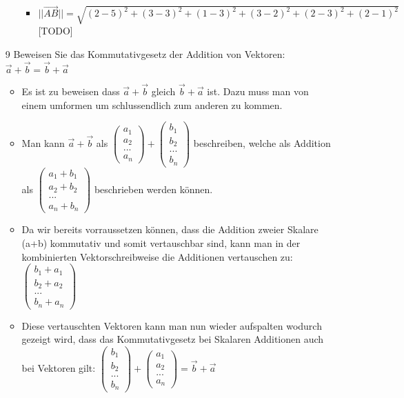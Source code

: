 \documentclass{article}
\begin{document}
\begin{itemize}
\begin{itemize}
			\begin{itemize}
				\item{$||\overrightarrow{AB}||=\sqrt{(2-5)^2+(3-3)^2+(1-3)^2+(3-2)^2+(2-3)^2+(2-1)^2}$ [TODO]}
			\end{itemize}
		\end{itemize}
		\item[9]{Beweisen Sie das Kommutativgesetz der Addition von Vektoren: $\vec{a}+\vec{b}=\vec{b}+\vec{a}$}
		\begin{itemize}
			\item{Es ist zu beweisen dass $\vec{a}+\vec{b}$ gleich $\vec{b}+\vec{a}$ ist. Dazu muss man von einem umformen um schlussendlich zum anderen zu kommen.}
			\item{Man kann $\vec{a}+\vec{b}$ als $\begin{pmatrix} a_1 \\ a_2 \\ ... \\ a_n \end{pmatrix}+\begin{pmatrix} b_1 \\ b_2 \\ ... \\ b_n \end{pmatrix}$ beschreiben, welche als Addition als $\begin{pmatrix} a_1 + b_1 \\  a_2 + b_2 \\ ... \\ a_n + b_n \end{pmatrix}$ beschrieben werden können.}
			\item{Da wir bereits vorraussetzen können, dass die Addition zweier Skalare (a+b) kommutativ und somit vertauschbar sind, kann man in der kombinierten Vektorschreibweise die Additionen vertauschen zu: $\begin{pmatrix} b_1 + a_1 \\  b_2 + a_2 \\ ... \\ b_n + a_n \end{pmatrix}$}
			\item{Diese vertauschten Vektoren kann man nun wieder aufspalten wodurch gezeigt wird, dass das Kommutativgesetz bei Skalaren Additionen auch bei Vektoren gilt: $\begin{pmatrix} b_1 \\ b_2 \\ ... \\ b_n \end{pmatrix}+\begin{pmatrix} a_1 \\ a_2 \\ ... \\ a_n \end{pmatrix}=\vec{b}+\vec{a}$}

\end{itemize}
\end{itemize}
\end{document}
